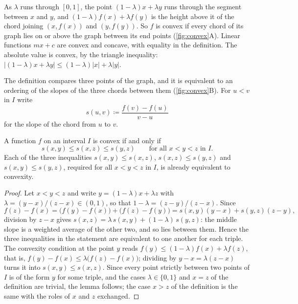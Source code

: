 As $\lambda$ runs through $[0,1]$, the point $(1-\lambda)x+\lambda y$ runs through the segment between $x$ and $y$, and $(1-\lambda)f(x)+\lambda f(y)$ is the height above it of the chord joining $(x,f(x))$ and $(y,f(y))$. So $f$ is convex if every chord of its graph lies on or above the graph between its end points (\cref{fig:convex}A). Linear functions $mx+c$ are convex and concave, with equality in the definition. The absolute value is convex, by the triangle inequality: $|(1-\lambda)x+\lambda y|\le(1-\lambda)|x|+\lambda|y|$.

The definition compares three points of the graph, and it is equivalent to an ordering of the slopes of the three chords between them (\cref{fig:convex}B). For $u<v$ in $I$ write
\[
s(u,v)\coloneqq\frac{f(v)-f(u)}{v-u}
\]
for the slope of the chord from $u$ to $v$.

\begin{lemma}
\label{lem:slopes}
A function $f$ on an interval $I$ is convex if and only if
\[
s(x,y)\le s(x,z)\le s(y,z)\qquad\text{for all }x<y<z\text{ in }I .
\]
Each of the three inequalities $s(x,y)\le s(x,z)$, $s(x,z)\le s(y,z)$ and $s(x,y)\le s(y,z)$, required for all $x<y<z$ in $I$, is already equivalent to convexity.
\end{lemma}

\begin{proof}
Let $x<y<z$ and write $y=(1-\lambda)x+\lambda z$ with $\lambda=(y-x)/(z-x)\in(0,1)$, so that $1-\lambda=(z-y)/(z-x)$. Since
\[
f(z)-f(x)=\bigl(f(y)-f(x)\bigr)+\bigl(f(z)-f(y)\bigr)=s(x,y)(y-x)+s(y,z)(z-y),
\]
division by $z-x$ gives $s(x,z)=\lambda\,s(x,y)+(1-\lambda)\,s(y,z)$: the middle slope is a weighted average of the other two, and so lies between them. Hence the three inequalities in the statement are equivalent to one another for each triple. The convexity condition at the point $y$ reads $f(y)\le(1-\lambda)f(x)+\lambda f(z)$, that is, $f(y)-f(x)\le\lambda\bigl(f(z)-f(x)\bigr)$; dividing by $y-x=\lambda(z-x)$ turns it into $s(x,y)\le s(x,z)$. Since every point strictly between two points of $I$ is of the form $y$ for some triple, and the cases $\lambda\in\{0,1\}$ and $x=z$ of the definition are trivial, the lemma follows; the case $x>z$ of the definition is the same with the roles of $x$ and $z$ exchanged.
\end{proof}

